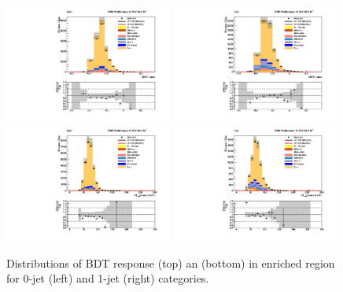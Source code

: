 \begin{figure}[!htpb]\centering
  \captionsetup{width=.96\textwidth,justification=centering}
 \includegraphics[width=0.49\textwidth]{plots_and_figures/chapter6/ztt_cr/0_preselection_BDT_value.pdf}
 \includegraphics[width=0.49\textwidth]{plots_and_figures/chapter6/ztt_cr/1_preselection_BDT_value.pdf} \\
 \includegraphics[width=0.49\textwidth]{plots_and_figures/chapter6/ztt_cr/0_preselection_h_collmass_pfmet.pdf} 
 \includegraphics[width=0.49\textwidth]{plots_and_figures/chapter6/ztt_cr/1_preselection_h_collmass_pfmet.pdf} \\

 \caption{Distributions of BDT response (top) an \mcol (bottom) in \ztt enriched region for 0-jet (left)  and 1-jet (right) categories.}
 \label{fig:ztt_cr}
\end{figure}


